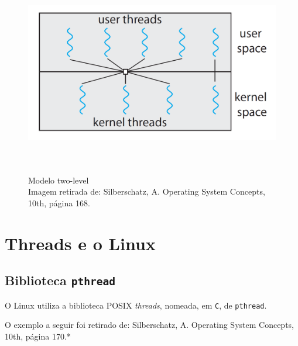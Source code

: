 \begin{figure}[h!]
\centering
\includegraphics[keepaspectratio, width=12cm, height=9cm]{imagens/06/06 - two-level.png}
\caption{Modelo two-level  \\
Imagem retirada de: Silberschatz, A. Operating System Concepts, 10th,
página 168. \\}
\label{fig:Modelo two-level}
\end{figure}


\hypertarget{threads-e-o-linux}{%
\section{Threads e o Linux}\label{threads-e-o-linux}}

\hypertarget{biblioteca-pthread}{%
\subsection{\texorpdfstring{Biblioteca
\texttt{pthread}}{Biblioteca pthread}}\label{biblioteca-pthread}}

O Linux utiliza a biblioteca POSIX \emph{threads}, nomeada, em
\texttt{C}, de \texttt{pthread}.

O exemplo a seguir foi retirado de: Silberschatz, A. Operating System
Concepts, 10th, página 170.*


